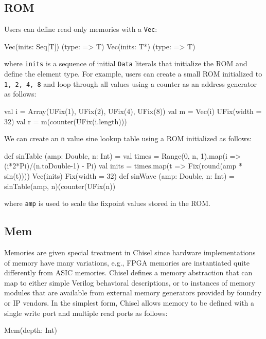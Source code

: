 \documentclass[twocolumn,10pt]{article}
\def\code#1{{\tt #1}}
\begin{document}
\subsection{ROM}

Users can define read only memories with a \code{Vec}:

\begin{scala}
Vec(inits: Seq[T]) (type: => T)
Vec(inits: T*) (type: => T)
\end{scala}

\noindent
where \verb+inits+ is a sequence of initial \verb+Data+ literals that
initialize the ROM and define the element type.
For example,  users can
create a small ROM initialized to \verb+1, 2, 4, 8+ and 
loop through all values using a counter as an address generator as follows:

\begin{scala}
val i = Array(UFix(1), UFix(2), UFix(4), UFix(8))
val m = Vec(i){ UFix(width = 32) }
val r = m(counter(UFix(i.length)))
\end{scala}

\noindent
We can create an \verb+n+ value sine lookup table using a ROM initialized as follows:

\begin{scala}
def sinTable (amp: Double, n: Int) = {
  val times = 
    Range(0, n, 1).map(i => (i*2*Pi)/(n.toDouble-1) - Pi)
  val inits = 
    times.map(t => Fix(round(amp * sin(t))))
  Vec(inits){ Fix(width = 32) }
}
def sinWave (amp: Double, n: Int) = 
  sinTable(amp, n)(counter(UFix(n))
\end{scala}

\noindent
where \verb+amp+ is used to scale the fixpoint values stored in the ROM.

\subsection{Mem}


Memories are given special treatment in Chisel since hardware
implementations of memory have many variations, e.g., FPGA memories
are instantiated quite differently from ASIC memories.  Chisel defines
a memory abstraction that can map to either simple Verilog behavioral
descriptions, or to instances of memory modules that are available
from external memory generators provided by foundry or IP vendors.  In
the simplest form, Chisel allows memory to be defined with a single
write port and multiple read ports as follows:

\begin{scala}
  Mem(depth: Int)
\end{scala}
\end{document}
